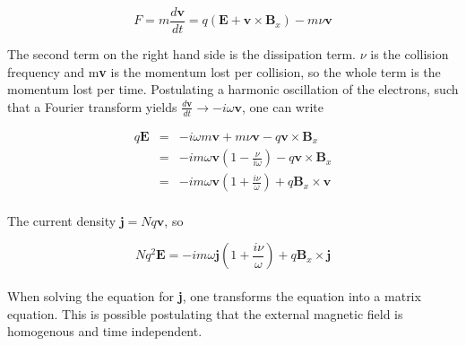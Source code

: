 \documentclass[a4paper,10pt]{thesis}
\begin{document}
\begin{equation}\label{eq_of_motion_electrons}
    F=m\frac{d\mathbf{v}}{dt}=q(\mathbf{E}+\mathbf{v} \times \mathbf{B}_x) - m\nu \textbf{v}
\end{equation}

The second term on the right hand side is the dissipation term. $\nu$ is the collision frequency and m\textbf{v} is the momentum lost per collision, so the whole term is the momentum lost per time. Postulating a harmonic oscillation of the electrons, such that a Fourier transform yields $\frac{d\mathbf{v}}{dt}\rightarrow-i \omega \mathbf{v}$, one can write

\begin{eqnarray}
    q\mathbf{E}&=&-i \omega m \mathbf{v} + m \nu \mathbf{v}-q\mathbf{v} \times \mathbf{B}_x\\
    &=& -i m \omega \mathbf{v} \left( 1   -  \frac{\nu}{i \omega}\right) -q\mathbf{v} \times \mathbf{B}_x\nonumber \\
&=& -i m \omega \mathbf{v} \left( 1   +  \frac{i \nu}{ \omega}\right) +q \mathbf{B}_x \times \mathbf{v} \nonumber
\end{eqnarray}

\paragraph*{}
The current density $\mathbf{j}=Nq\mathbf{v}$, so

\begin{equation}\label{get_conductivity}
    Nq^2\mathbf{E}= -i m \omega \mathbf{j} \left( 1   +  \frac{i \nu}{ \omega}\right) +q \mathbf{B}_x \times \mathbf{j}
\end{equation}

\paragraph*{}
When solving the equation for \textbf{j}, one transforms the equation into a matrix equation. This is possible postulating that the external magnetic field is homogenous and time independent.
\end{document}

